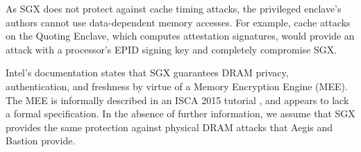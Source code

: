 As SGX does not protect against cache timing attacks, the privileged enclave's
authors cannot use data-dependent memory accesses. For example, cache attacks
on the Quoting Enclave, which computes attestation signatures, would provide
an attack with a processor's EPID signing key and completely compromise SGX.

Intel's documentation states that SGX guarantees DRAM privacy, authentication,
and freshness by virtue of a Memory Encryption Engine (MEE). The MEE is
informally described in an ISCA 2015 tutorial \cite{intel2015iscasgx}, and
appears to lack a formal specification. In the absence of further information,
we assume that SGX provides the same protection against physical DRAM attacks
that Aegis and Bastion provide.
